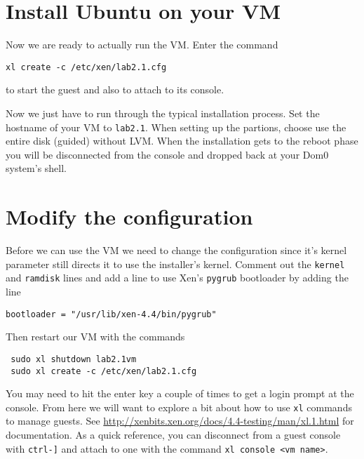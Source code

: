 \documentclass{article}
\begin{document}
 \section{Install Ubuntu on your VM}
 Now we are ready to actually run the VM. Enter the command
 
 \texttt{xl create -c /etc/xen/lab2.1.cfg}
 
 to start the guest and also to attach to its console.
 
 Now we just have to run through the typical installation process. Set the hostname of your VM to \texttt{lab2.1}. When setting up the partions,
 choose use the entire disk (guided) without LVM. When the installation gets to the reboot phase you will be disconnected from the console and dropped back at your 
 Dom0 system's shell.
 
 \section{Modify the configuration}
 Before we can use the VM we need to change the configuration since it's kernel parameter still directs it to use the installer's kernel. Comment out the \texttt{kernel} and \texttt{ramdisk} lines and add a line to use Xen's \texttt{pygrub} bootloader by adding the line
 
 \texttt{bootloader = "/usr/lib/xen-4.4/bin/pygrub"}
 
 Then restart our VM with the commands
 
 \begin{verbatim}
 sudo xl shutdown lab2.1vm
 sudo xl create -c /etc/xen/lab2.1.cfg
 \end{verbatim}
 
 You may need to hit the enter key a couple of times to get a login prompt at the console. From here we will want to explore a bit about how to use \texttt{xl} commands to manage guests. See \url{http://xenbits.xen.org/docs/4.4-testing/man/xl.1.html} for documentation. As a quick reference, you can disconnect from a guest console with \texttt{ctrl-]} and attach to one with the command \texttt{xl console <vm name>}.
 
 
 
\end{document}
